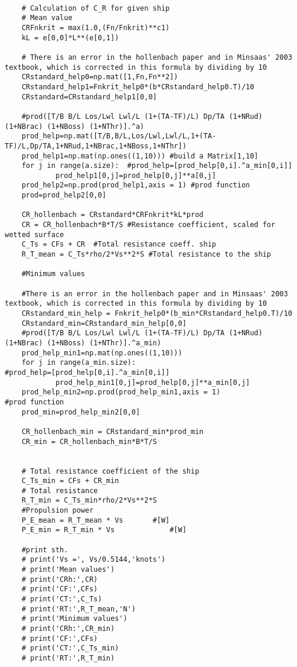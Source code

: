 \begin{lstlisting}[caption=Rewritten Python script based on the given MATLAB script (\autoref{Cost Hull}), label=oricalcosthull]
    
    # Calculation of C_R for given ship 
    # Mean value
    CRFnkrit = max(1.0,(Fn/Fnkrit)**c1)
    kL = e[0,0]*L**(e[0,1])

    # There is an error in the hollenbach paper and in Minsaas' 2003 textbook, which is corrected in this formula by dividing by 10
    CRstandard_help0=np.mat([1,Fn,Fn**2])
    CRstandard_help1=Fnkrit_help0*(b*CRstandard_help0.T)/10
    CRstandard=CRstandard_help1[0,0]

    #prod([T/B B/L Los/Lwl Lwl/L (1+(TA-TF)/L) Dp/TA (1+NRud) (1+NBrac) (1+NBoss) (1+NThr)].^a)
    prod_help=np.mat([T/B,B/L,Los/Lwl,Lwl/L,1+(TA-TF)/L,Dp/TA,1+NRud,1+NBrac,1+NBoss,1+NThr])
    prod_help1=np.mat(np.ones((1,10))) #build a Matrix[1,10]
    for j in range(a.size):  #prod_help=[prod_help[0,i].^a_min[0,i]]
            prod_help1[0,j]=prod_help[0,j]**a[0,j]
    prod_help2=np.prod(prod_help1,axis = 1) #prod function
    prod=prod_help2[0,0]

    CR_hollenbach = CRstandard*CRFnkrit*kL*prod
    CR = CR_hollenbach*B*T/S #Resistance coefficient, scaled for wetted surface
    C_Ts = CFs + CR  #Total resistance coeff. ship 
    R_T_mean = C_Ts*rho/2*Vs**2*S #Total resistance to the ship

    #Minimum values

    #There is an error in the hollenbach paper and in Minsaas' 2003 textbook, which is corrected in this formula by dividing by 10
    CRstandard_min_help = Fnkrit_help0*(b_min*CRstandard_help0.T)/10
    CRstandard_min=CRstandard_min_help[0,0]
    #prod([T/B B/L Los/Lwl Lwl/L (1+(TA-TF)/L) Dp/TA (1+NRud) (1+NBrac) (1+NBoss) (1+NThr)].^a_min)
    prod_help_min1=np.mat(np.ones((1,10))) 
    for j in range(a_min.size):                                            #prod_help=[prod_help[0,i].^a_min[0,i]]
            prod_help_min1[0,j]=prod_help[0,j]**a_min[0,j]
    prod_help_min2=np.prod(prod_help_min1,axis = 1)                 #prod function
    prod_min=prod_help_min2[0,0]

    CR_hollenbach_min = CRstandard_min*prod_min
    CR_min = CR_hollenbach_min*B*T/S


    # Total resistance coefficient of the ship 
    C_Ts_min = CFs + CR_min
    # Total resistance	
    R_T_min = C_Ts_min*rho/2*Vs**2*S
    #Propulsion power
    P_E_mean = R_T_mean * Vs       #[W]
    P_E_min = R_T_min * Vs             #[W]

    #print sth.
    # print('Vs =', Vs/0.5144,'knots')
    # print('Mean values')
    # print('CRh:',CR)
    # print('CF:',CFs)
    # print('CT:',C_Ts)
    # print('RT:',R_T_mean,'N')
    # print('Minimum values')
    # print('CRh:',CR_min)
    # print('CF:',CFs)
    # print('CT:',C_Ts_min)
    # print('RT:',R_T_min)


\end{lstlisting}

